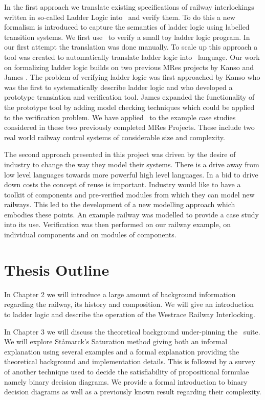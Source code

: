 In the first approach we translate
existing specifications of railway interlockings written in so-called 
Ladder Logic
into \scade \ and verify them. To do this a new formalism is introduced 
to capture
the semantics of ladder logic using labelled transition systems.
We first use \scade \ to verify a small toy ladder logic program. In our 
first
attempt the translation was done manually. To scale up this approach a tool was created to automatically translate
ladder logic into \scade \ language. Our work on formalizing ladder logic builds on two
previous MRes projects by Kanso \cite{KKanso} and James \cite{PJames}. The
problem of verifying ladder logic was first approached by Kanso \cite{KKanso}
who was the first to systematically describe ladder logic and who developed
a prototype translation and verification tool. James \cite{PJames} expanded the
functionality of the prototype tool by adding model checking techniques which could be
applied to the verification problem. We have applied \scade \ to the example case studies considered in these
two previously completed MRes Projects. These include two real world
railway control systems of considerable size and complexity.

The second approach presented in this project was driven by the desire 
of industry to change
the way they model their systems. There is a drive away from low level
languages towards more powerful high level languages. In a bid to drive down
costs the concept of reuse is important. Industry would like to have a 
toolkit
of components and pre-verified modules from which they can model new
railways. This led to the development of a new modelling approach which
embodies these points. An example railway was modelled to provide a case 
study
into its use. Verification was then performed on our railway example, on
individual components and on modules of components.

\section{Thesis Outline}

In Chapter 2 we will introduce a large amount of background information
regarding the railway, its history and composition. We will give an
introduction to ladder logic and describe the operation of the Westrace
Railway Interlocking.

In Chapter 3 we will discuss the theoretical background under-pinning the
\scade \ suite. We will explore St{\aa}marck's Saturation method giving both an
informal explanation using several examples and a formal explanation providing
the theoretical background and implementation details. This is followed by a survey of another technique used to decide the satisfiability of
propositional formulae namely binary decision diagrams. We provide a
formal introduction to binary decision diagrams as well as a previously known
result regarding their complexity.

